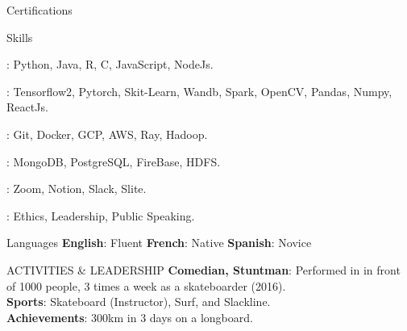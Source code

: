 \documentclass{resume}
\begin{document}
\begin{multicols}{2}
\begin{rSection}{\Large Certifications}
\begin{description}
		\end{description}
	\end{rSection}

	\begin{rSection}{\Large Skills}
		\begin{description}
			\setlength\itemsep{-0.5em}
			\item[$\bullet$ Languages]: Python, Java, R, C, JavaScript, NodeJs.
			\item[$\bullet$ Libraries]: Tensorflow2, Pytorch, Skit-Learn, Wandb, Spark, OpenCV, Pandas, Numpy, ReactJs.
			\item[$\bullet$ Tools]: Git, Docker, GCP, AWS, Ray, Hadoop.
			\item[$\bullet$ Databases]: MongoDB, PostgreSQL, FireBase, HDFS.
			\item[$\bullet$ Teamwork]: Zoom, Notion, Slack, Slite.
			\item[$\bullet$ Soft Skills]: Ethics, Leadership, Public Speaking.
		\end{description}
	\end{rSection}

	\begin{rSection}{\Large Languages}
		\textbf{English}:  Fluent \hspace{1ex} \textbf{French}: Native \hspace{1ex} \textbf{Spanish}:  Novice
	\end{rSection}

	\begin{rSection}{\Large ACTIVITIES \& LEADERSHIP}
		\textbf{Comedian, Stuntman}: Performed in  in front of 1000 people, 3 times a week as a skateboarder (2016).\\
		\textbf{Sports}: Skateboard (Instructor), Surf, and Slackline.\\
		\textbf{Achievements}: 300km in 3 days on a longboard.
	\end{rSection}
	
	\end{multicols}
\end{document}
